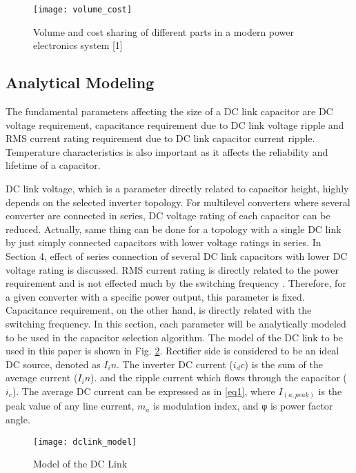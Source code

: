 \documentclass[conference,a4paper,twocolumn]{IEEEtran}
\begin{document}
\begin{figure}[h]
  \centering
  \texttt{[image: volume\_cost]}
  \caption{Volume and cost sharing of different parts in a modern power electronics system [1]}
  \label{fig2}
\end{figure}


\subsection{Analytical Modeling}


The fundamental parameters affecting the size of a DC link capacitor are DC voltage requirement, capacitance requirement due to DC link voltage ripple and RMS current rating requirement due to DC link capacitor current ripple. Temperature characteristics is also important as it affects the reliability and lifetime of a capacitor. 

DC link voltage, which is a parameter directly related to capacitor height, highly depends on the selected inverter topology. For multilevel converters where several converter are connected in series, DC voltage rating of each capacitor can be reduced. Actually, same thing can be done for a topology with a single DC link by just simply connected capacitors with lower voltage ratings in series. In Section 4, effect of series connection of several DC link capacitors with lower DC voltage rating is discussed. RMS current rating is directly related to the power requirement and is not effected much by the switching frequency \cite{Wang2013,Wang2015,Su2010}. Therefore, for a given converter with a specific power output, this parameter is fixed. Capacitance requirement, on the other hand, is directly related with the switching frequency. In this section, each parameter will be analytically modeled to be used in the capacitor selection algorithm. The model of the DC link to be used in this paper is shown in Fig. \ref{fig3}.
Rectifier side is considered to be an ideal DC source, denoted as $I_in$. The inverter DC current ($i_dc$) is the sum of the average current ($I_in$). and the ripple current which flows through the capacitor ($i_c$). The average DC current can be expressed as in \ref{eq1}, where $I_(a,peak)$ is the peak value of any line current, $m_a$ is modulation index, and φ is power factor angle.

\begin{figure}[h]
  \centering
  \texttt{[image: dclink\_model]}
  \caption{Model of the DC Link}
  \label{fig3}
\end{figure}
\end{document}
